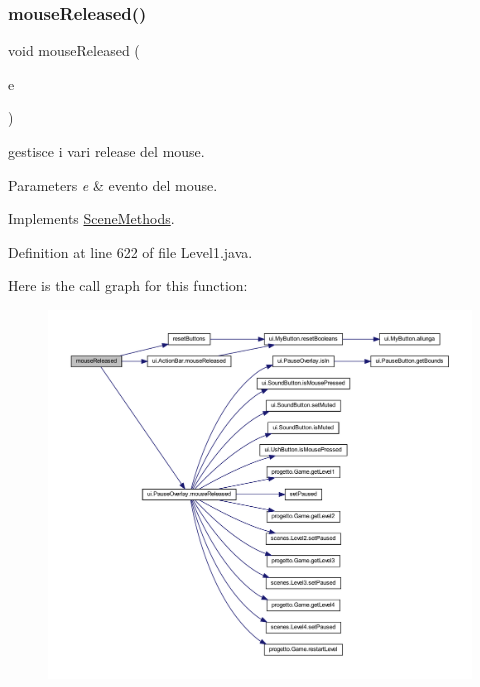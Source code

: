 \subsubsection{\texorpdfstring{mouse\+Released()}{mouseReleased()}}
{\footnotesize\ttfamily void mouse\+Released (\begin{DoxyParamCaption}\item[{Mouse\+Event}]{e }\end{DoxyParamCaption})}



gestisce i vari release del mouse. 


\begin{DoxyParams}{Parameters}
{\em e} & evento del mouse. \\
\hline
\end{DoxyParams}


Implements \hyperlink{interfacescenes_1_1_scene_methods_a87a07291794e15052db67f945d90853e}{Scene\+Methods}.



Definition at line 622 of file Level1.\+java.

Here is the call graph for this function\+:\nopagebreak
\begin{figure}[H]
\begin{center}
\leavevmode
\includegraphics[width=350pt]{classscenes_1_1_level1_a87a07291794e15052db67f945d90853e_cgraph}
\end{center}
\end{figure}
\mbox{\label{classscenes_1_1_level1_addba85b44e35a186e066b2e801f433c4}} 
